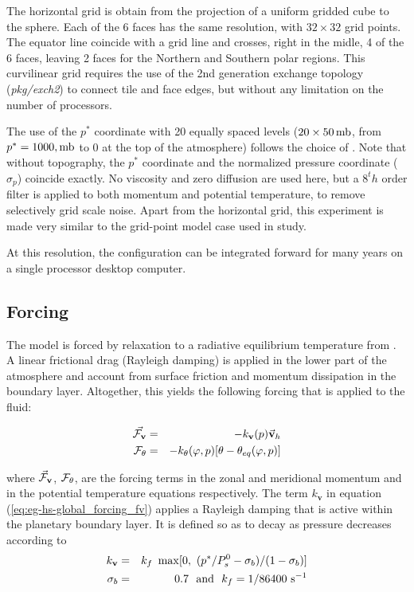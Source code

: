 The horizontal grid is obtain from the projection of a uniform gridded cube 
to the sphere. Each of the 6 faces has the same resolution, with 
$32 \times 32$ grid points. The equator line coincide with a grid line
and crosses, right in the midle, 4 of the 6 faces, leaving 2 faces 
for the Northern and Southern polar regions.
This curvilinear grid requires the use of the 2nd generation exchange
topology ({\it pkg/exch2}) to connect tile and face edges,
but without any limitation on the number of processors.

The use of the $p^*$ coordinate with 20 equally spaced levels
($20 \times 50\,{\rm mb}$, from $p^*=1000,{\rm mb}$ to $0$ at the 
top of the atmosphere) follows the choice of \cite{held-suar:94}. 
Note that without topography, the $p^*$ coordinate and the normalized 
pressure coordinate ($\sigma_p$) coincide exactly.
No viscosity and zero diffusion are used here, but
a $8^th$ order \cite{Shapiro_70} filter is applied to both momentum and
potential temperature, to remove selectively grid scale noise.
Apart from the horizontal grid, this experiment is made very similar to
the grid-point model case used in \cite{held-suar:94} study.

At this resolution, the configuration can be integrated forward 
for many years on a single processor desktop computer.
\\

\subsection{Forcing}

The model is forced by relaxation to a radiative equilibrium temperature from
\cite{held-suar:94}.
A linear frictional drag (Rayleigh damping) is applied in the lower 
part of the atmosphere and account from surface friction and momentum
dissipation in the boundary layer.
Altogether, this yields the following forcing 
\cite[from][]{held-suar:94} that is applied to the fluid:

\begin{eqnarray}
\label{eq:eg-hs-global_forcing}
\label{eq:eg-hs-global_forcing_fv}
\vec{{\cal F}_\mathbf{v}} & = & -k_\mathbf{v}(p)\vec{\mathbf{v}}_h
\\
\label{eq:eg-hs-global_forcing_ft}
{\cal F}_{\theta} & = & -k_{\theta}(\varphi,p)[\theta-\theta_{eq}(\varphi,p)]
\end{eqnarray}

\noindent where $\vec{\cal F}_\mathbf{v}$, ${\cal F}_{\theta}$,
are the forcing terms in the zonal and meridional
momentum and in the potential temperature equations respectively.
The term $k_\mathbf{v}$ in equation (\ref{eq:eg-hs-global_forcing_fv}) applies a
Rayleigh damping that is active within the planetary boundary layer. 
It is defined so as to decay as pressure decreases according to
\begin{eqnarray*}
\label{eq:eg-hs-define_kv}
k_\mathbf{v} & = & k_{f}~\max[0,~(p^*/P^{0}_{s}-\sigma_{b})/(1-\sigma_{b})]
\\
\sigma_{b} & = & 0.7 ~~{\rm and}~~
k_{f}  =  1/86400 ~{\rm s}^{-1}
\end{eqnarray*}

